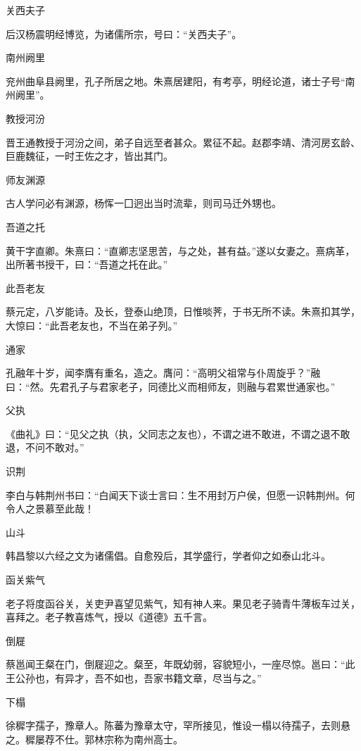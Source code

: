 \documentclass[a4paper,12pt,UTF8,twoside]{ctexbook}
\begin{document}
    关西夫子
    
    后汉杨震明经博览，为诸儒所宗，号曰：“关西夫子”。
    
    南州阙里
    
    兖州曲阜县阙里，孔子所居之地。朱熹居建阳，有考亭，明经论道，诸士子号“南州阙里”。
    
    教授河汾
    
    晋王通教授于河汾之间，弟子自远至者甚众。累征不起。赵郡李靖、清河房玄龄、巨鹿魏征，一时王佐之才，皆出其门。
    
    师友渊源
    
    古人学问必有渊源，杨恽一囗迥出当时流辈，则司马迁外甥也。
    
    吾道之托
    
    黄干字直卿。朱熹曰：“直卿志坚思苦，与之处，甚有益。”遂以女妻之。熹病革，出所著书授干，曰：“吾道之托在此。”
    
    此吾老友
    
    蔡元定，八岁能诗。及长，登泰山绝顶，日惟啖荠，于书无所不读。朱熹扣其学，大惊曰：“此吾老友也，不当在弟子列。”
    
    通家
    
    孔融年十岁，闻李膺有重名，造之。膺问：“高明父祖常与仆周旋乎？”融曰：“然。先君孔子与君家老子，同德比义而相师友，则融与君累世通家也。”
    
    父执
    
    《曲礼》曰：“见父之执（执，父同志之友也），不谓之进不敢进，不谓之退不敢退，不问不敢对。”
    
    识荆
    
    李白与韩荆州书曰：“白闻天下谈士言曰：生不用封万户侯，但愿一识韩荆州。何令人之景慕至此哉！
    
    山斗
    
    韩昌黎以六经之文为诸儒倡。自愈殁后，其学盛行，学者仰之如泰山北斗。
    
    函关紫气
    
    老子将度函谷关，关吏尹喜望见紫气，知有神人来。果见老子骑青牛薄板车过关，喜拜之。老子教喜炼气，授以《道德》五千言。
    
    倒屣
    
    蔡邕闻王粲在门，倒屣迎之。粲至，年既幼弱，容貌短小，一座尽惊。邕曰：“此王公孙也，有异才，吾不如也，吾家书籍文章，尽当与之。”
    
    下榻
    
    徐穉字孺子，豫章人。陈蕃为豫章太守，罕所接见，惟设一榻以待孺子，去则悬之。穉屡荐不仕。郭林宗称为南州高士。
    
\end{document}
